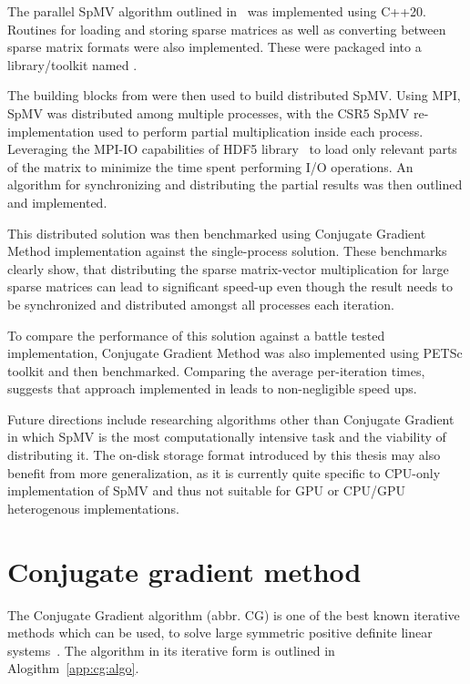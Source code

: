 \documentclass[thesis=M,english]{FITthesis}[2019/12/23]
\begin{document}
The parallel SpMV algorithm outlined in~\cite{liu2015csr5} was implemented using C++20. Routines for
loading and storing sparse matrices as well as converting between sparse matrix formats were
also implemented. These were packaged into a library/toolkit named .

The building blocks from  were then used to build distributed SpMV\@. Using MPI, SpMV was
distributed among multiple processes, with the CSR5 SpMV re-implementation used to perform partial
multiplication inside each process. Leveraging the MPI-IO capabilities of HDF5 library~\cite{hdf5} to load only
relevant parts of the matrix to minimize the time spent performing I/O operations. An algorithm for
synchronizing and distributing the partial results was then outlined and implemented.

This distributed solution was then benchmarked using Conjugate Gradient Method implementation against the
single-process solution. These benchmarks clearly show, that distributing the sparse matrix-vector multiplication
for large sparse matrices can lead to significant speed-up even though the result needs to be synchronized
and distributed amongst all processes each iteration.

To compare the performance of this solution against a battle tested implementation, Conjugate Gradient Method
was also implemented using PETSc toolkit and then benchmarked. Comparing the average per-iteration times,
suggests that approach implemented in  leads to non-negligible speed ups.

Future directions include researching algorithms other than Conjugate Gradient in which SpMV is the
most computationally intensive task and the viability of distributing it. The on-disk storage format
introduced by this thesis may also benefit from more generalization, as it is currently quite specific to
CPU-only implementation of SpMV and thus not suitable for GPU or CPU/GPU heterogenous implementations.





\appendix


\chapter{Conjugate gradient method}\label{app:cg}

The Conjugate Gradient algorithm (abbr. CG) is one of the best known iterative methods which can be used, to solve large
symmetric positive definite linear systems~\cite{saad03:IMS}. The algorithm in its iterative form is outlined
in Alogithm~\ref{app:cg:algo}.
\end{document}
